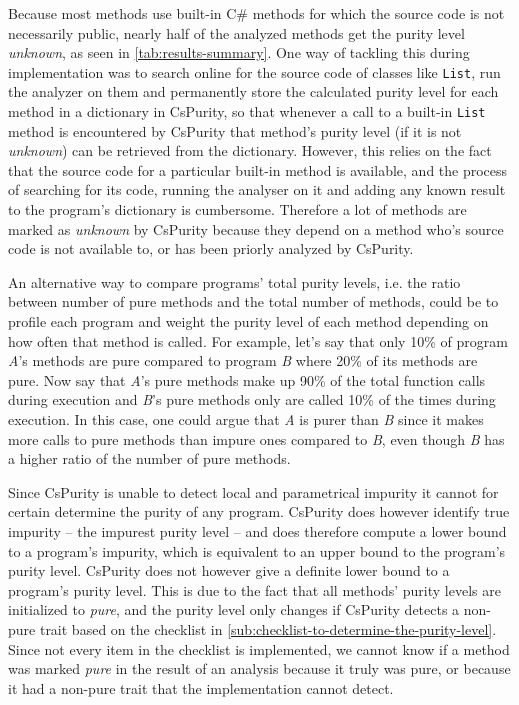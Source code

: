\documentclass[a4paper,12pt]{article}
\begin{document}
Because most methods use built-in C\# methods for which the source code is not necessarily public, nearly half of the analyzed methods get the purity level \textit{unknown}, as seen in \autoref{tab:results-summary}. One way of tackling this during implementation was to search online for the source code of classes like \texttt{List}, run the analyzer on them and permanently store the calculated purity level for each method in a dictionary in CsPurity, so that whenever a call to a built-in \texttt{List} method is encountered by CsPurity that method's purity level (if it is not \textit{unknown}) can be retrieved from the dictionary. However, this relies on the fact that the source code for a particular built-in method is available, and the process of searching for its code, running the analyser on it and adding any known result to the program's dictionary is cumbersome. Therefore a lot of methods are marked as \textit{unknown} by CsPurity because they depend on a method who's source code is not available to, or has been priorly analyzed by CsPurity.

An alternative way to compare programs' total purity levels, i.e. the ratio between number of pure methods and the total number of methods, could be to profile each program and weight the purity level of each method depending on how often that method is called. For example, let's say that only 10\% of program \textit{A}'s methods are pure compared to program \textit{B} where 20\% of its methods are pure. Now say that \textit{A}'s pure methods make up 90\% of the total function calls during execution and \textit{B}'s pure methods only are called 10\% of the times during execution. In this case, one could argue that \textit{A} is purer than \textit{B} since it makes more calls to pure methods than impure ones compared to \textit{B}, even though \textit{B} has a higher ratio of the number of pure methods.

Since CsPurity is unable to detect local and parametrical impurity it cannot for certain determine the purity of any program. CsPurity does however identify true impurity -- the impurest purity level -- and does therefore compute a lower bound to a program's impurity, which is equivalent to an upper bound to the program's purity level. CsPurity does not however give a definite lower bound to a program's purity level. This is due to the fact that all methods' purity levels are initialized to \textit{pure}, and the purity level only changes if CsPurity detects a non-pure trait based on the checklist in \autoref{sub:checklist-to-determine-the-purity-level}. Since not every item in the checklist is implemented, we cannot know if a method was marked \textit{pure} in the result of an analysis because it truly was pure, or because it had a non-pure trait that the implementation cannot detect.
\end{document}
